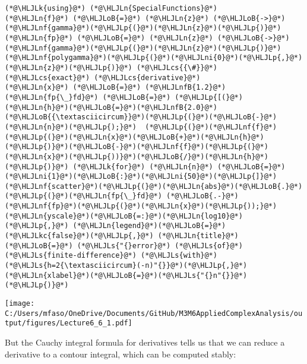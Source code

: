 \documentclass[12pt,a4paper]{article}
\newcommand{\HLJLk}[1]{\textcolor[RGB]{148,91,176}{\textbf{#1}}}
\newcommand{\HLJLkc}[1]{\textcolor[RGB]{59,151,46}{\textit{#1}}}
\newcommand{\HLJLn}[1]{#1}
\newcommand{\HLJLnf}[1]{\textcolor[RGB]{66,102,213}{#1}}
\newcommand{\HLJLs}[1]{\textcolor[RGB]{201,61,57}{#1}}
\newcommand{\HLJLnfB}[1]{\textcolor[RGB]{59,151,46}{#1}}
\newcommand{\HLJLni}[1]{\textcolor[RGB]{59,151,46}{#1}}
\newcommand{\HLJLoB}[1]{\textcolor[RGB]{102,102,102}{\textbf{#1}}}
\newcommand{\HLJLp}[1]{#1}
\newcommand{\HLJLcs}[1]{\textcolor[RGB]{153,153,119}{\textit{#1}}}
\begin{document}
\begin{lstlisting}
(*@\HLJLk{using}@*) (*@\HLJLn{SpecialFunctions}@*)
(*@\HLJLn{f}@*) (*@\HLJLoB{=}@*) (*@\HLJLn{z}@*) (*@\HLJLoB{->}@*) (*@\HLJLnf{gamma}@*)(*@\HLJLp{(}@*)(*@\HLJLn{z}@*)(*@\HLJLp{)}@*)
(*@\HLJLn{fp}@*) (*@\HLJLoB{=}@*) (*@\HLJLn{z}@*) (*@\HLJLoB{->}@*) (*@\HLJLnf{gamma}@*)(*@\HLJLp{(}@*)(*@\HLJLn{z}@*)(*@\HLJLp{)}@*)(*@\HLJLnf{polygamma}@*)(*@\HLJLp{(}@*)(*@\HLJLni{0}@*)(*@\HLJLp{,}@*)(*@\HLJLn{z}@*)(*@\HLJLp{)}@*) (*@\HLJLcs{{\#}}@*) (*@\HLJLcs{exact}@*) (*@\HLJLcs{derivative}@*)
(*@\HLJLn{x}@*) (*@\HLJLoB{=}@*) (*@\HLJLnfB{1.2}@*)
(*@\HLJLn{fp{\_}fd}@*) (*@\HLJLoB{=}@*) (*@\HLJLp{[(}@*)(*@\HLJLn{h}@*)(*@\HLJLoB{=}@*)(*@\HLJLnfB{2.0}@*)(*@\HLJLoB{{\textasciicircum}}@*)(*@\HLJLp{(}@*)(*@\HLJLoB{-}@*)(*@\HLJLn{n}@*)(*@\HLJLp{);}@*)  (*@\HLJLp{(}@*)(*@\HLJLnf{f}@*)(*@\HLJLp{(}@*)(*@\HLJLn{x}@*)(*@\HLJLoB{+}@*)(*@\HLJLn{h}@*)(*@\HLJLp{)}@*)(*@\HLJLoB{-}@*)(*@\HLJLnf{f}@*)(*@\HLJLp{(}@*)(*@\HLJLn{x}@*)(*@\HLJLp{))}@*)(*@\HLJLoB{/}@*)(*@\HLJLn{h}@*)(*@\HLJLp{)}@*) (*@\HLJLk{for}@*) (*@\HLJLn{n}@*) (*@\HLJLoB{=}@*) (*@\HLJLni{1}@*)(*@\HLJLoB{:}@*)(*@\HLJLni{50}@*)(*@\HLJLp{]}@*)
(*@\HLJLnf{scatter}@*)(*@\HLJLp{(}@*)(*@\HLJLn{abs}@*)(*@\HLJLoB{.}@*)(*@\HLJLp{(}@*)(*@\HLJLn{fp{\_}fd}@*) (*@\HLJLoB{.-}@*) (*@\HLJLnf{fp}@*)(*@\HLJLp{(}@*)(*@\HLJLn{x}@*)(*@\HLJLp{));}@*) (*@\HLJLn{yscale}@*)(*@\HLJLoB{=:}@*)(*@\HLJLn{log10}@*)(*@\HLJLp{,}@*) (*@\HLJLn{legend}@*)(*@\HLJLoB{=}@*)(*@\HLJLkc{false}@*)(*@\HLJLp{,}@*) (*@\HLJLn{title}@*) (*@\HLJLoB{=}@*) (*@\HLJLs{"{}error}@*) (*@\HLJLs{of}@*) (*@\HLJLs{finite-difference}@*) (*@\HLJLs{with}@*) (*@\HLJLs{h=2{\textasciicircum}(-n)"{}}@*)(*@\HLJLp{,}@*) (*@\HLJLn{xlabel}@*)(*@\HLJLoB{=}@*)(*@\HLJLs{"{}n"{}}@*)(*@\HLJLp{)}@*)
\end{lstlisting}

\texttt{[image: C:/Users/mfaso/OneDrive/Documents/GitHub/M3M6AppliedComplexAnalysis/output/figures/Lecture6\_6\_1.pdf]}

But the Cauchy integral formula for derivatives tells us that we can reduce a derivative to a contour integral, which can be computed stably:
\end{document}
